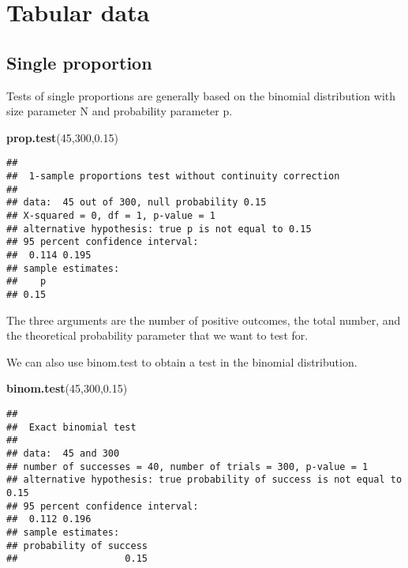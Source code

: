 \documentclass[]{book}
\newenvironment{Shaded}{\begin{snugshade}}{\end{snugshade}}
\newcommand{\KeywordTok}[1]{\textcolor[rgb]{0.13,0.29,0.53}{\textbf{#1}}}
\newcommand{\DecValTok}[1]{\textcolor[rgb]{0.00,0.00,0.81}{#1}}
\newcommand{\FloatTok}[1]{\textcolor[rgb]{0.00,0.00,0.81}{#1}}
\newcommand{\NormalTok}[1]{#1}
\theoremstyle{definition}
\theoremstyle{definition}
\theoremstyle{definition}
\theoremstyle{remark}
\begin{document}
\section{Tabular data}\label{tabular-data}

\subsection{Single proportion}\label{single-proportion}

Tests of single proportions are generally based on the binomial
distribution with size parameter N and probability parameter p.

\begin{Shaded}
\begin{Highlighting}[]
\KeywordTok{prop.test}\NormalTok{(}\DecValTok{45}\NormalTok{,}\DecValTok{300}\NormalTok{,}\FloatTok{0.15}\NormalTok{)}
\end{Highlighting}
\end{Shaded}

\begin{verbatim}
## 
##  1-sample proportions test without continuity correction
## 
## data:  45 out of 300, null probability 0.15
## X-squared = 0, df = 1, p-value = 1
## alternative hypothesis: true p is not equal to 0.15
## 95 percent confidence interval:
##  0.114 0.195
## sample estimates:
##    p 
## 0.15
\end{verbatim}

The three arguments are the number of positive outcomes, the total
number, and the theoretical probability parameter that we want to test
for.

We can also use binom.test to obtain a test in the binomial
distribution.

\begin{Shaded}
\begin{Highlighting}[]
\KeywordTok{binom.test}\NormalTok{(}\DecValTok{45}\NormalTok{,}\DecValTok{300}\NormalTok{,}\FloatTok{0.15}\NormalTok{)}
\end{Highlighting}
\end{Shaded}

\begin{verbatim}
## 
##  Exact binomial test
## 
## data:  45 and 300
## number of successes = 40, number of trials = 300, p-value = 1
## alternative hypothesis: true probability of success is not equal to 0.15
## 95 percent confidence interval:
##  0.112 0.196
## sample estimates:
## probability of success 
##                   0.15
\end{verbatim}
\end{document}
